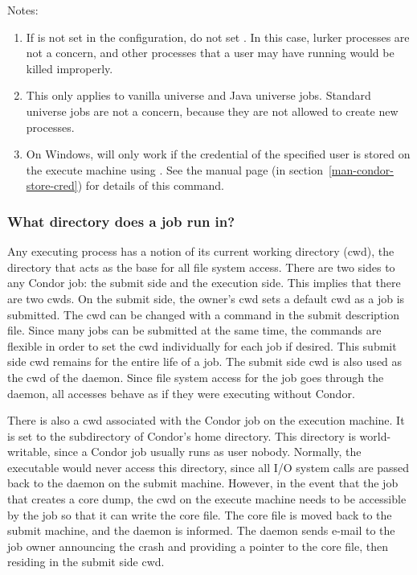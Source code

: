Notes:
\begin{enumerate}

\item{
If  is not set in the configuration, do not
set .
In this case, lurker processes are not a concern,
and other processes that a user may have running would be killed
improperly.
}

\item{
This only applies to vanilla universe and Java universe jobs.
Standard universe jobs are not a concern,
because they are not allowed to create new processes.
}

\item{
On Windows,  will only work if the credential
of the specified user is stored on the execute machine
using .
See the 
manual page (in section~\ref{man-condor-store-cred}) for details of this command.
}
\end{enumerate}



\subsubsection{\label{sec:DirOfJob}What directory does a job run in?}

Any executing process has a notion of its current working
directory (cwd),
the directory that acts as the base for all file system access.
There are two sides to any Condor job:
the submit side and the execution side.
This implies that there are two cwds.
On the submit side, the owner's cwd sets
a default cwd as a job is submitted.
The cwd can be changed with a command in the submit description file.
Since many jobs can be submitted at the same time,
the commands are flexible in order to set the cwd individually for
each job if desired.
This submit side cwd remains for the entire life of a job.
The submit side cwd is also used as the cwd of the  daemon.
Since file system access for the job goes through the 
daemon,
all accesses behave as if they were executing without Condor.

There is also a cwd associated with the Condor job on the execution machine.
It is set to the  subdirectory of Condor's home directory.
This directory is world-writable, since a Condor job usually runs as user
nobody.
Normally, the executable would never access this directory,
since all I/O system calls are passed back to the  daemon
on the submit machine.
However, in the event that the job that creates a core dump,
the cwd on the execute machine needs to be accessible by
the job so that it can write the core file.
The core file is moved back to the submit machine,
and the  daemon is informed.
The  daemon sends e-mail to the job owner announcing the
crash and providing a pointer to the core file, then residing
in the submit side cwd.

